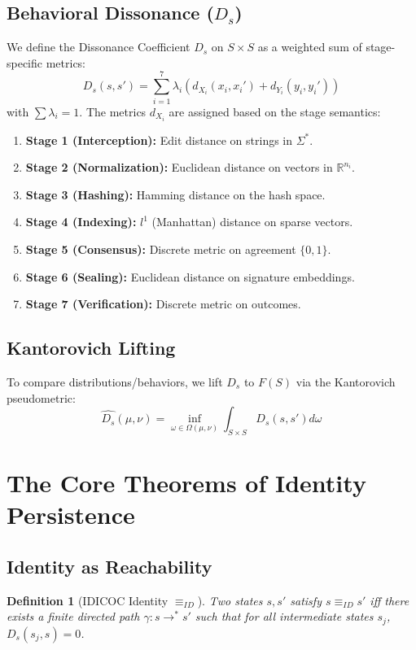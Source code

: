 \documentclass[11pt,a4paper]{article}
\newtheorem{definition}[theorem]{Definition}
\begin{document}
\subsection{Behavioral Dissonance ($D_s$)}
We define the Dissonance Coefficient $D_s$ on $S \times S$ as a weighted sum of stage-specific metrics:
\begin{equation}
D_s(s, s') = \sum_{i=1}^{7} \lambda_i (d_{X_i}(x_i, x_i') + d_{Y_i}(y_i, y_i'))
\end{equation}
with $\sum \lambda_i = 1$. The metrics $d_{X_i}$ are assigned based on the stage semantics:
\begin{enumerate}
    \item \textbf{Stage 1 (Interception):} Edit distance on strings in $\Sigma^*$.
    \item \textbf{Stage 2 (Normalization):} Euclidean distance on vectors in $\mathbb{R}^{n_i}$.
    \item \textbf{Stage 3 (Hashing):} Hamming distance on the hash space.
    \item \textbf{Stage 4 (Indexing):} $l^1$ (Manhattan) distance on sparse vectors.
    \item \textbf{Stage 5 (Consensus):} Discrete metric on agreement $\{0,1\}$.
    \item \textbf{Stage 6 (Sealing):} Euclidean distance on signature embeddings.
    \item \textbf{Stage 7 (Verification):} Discrete metric on outcomes.
\end{enumerate}

\subsection{Kantorovich Lifting}
To compare distributions/behaviors, we lift $D_s$ to $F(S)$ via the Kantorovich pseudometric:
\begin{equation}
\hat{D_s}(\mu, \nu) = \inf_{\omega \in \Omega(\mu, \nu)} \int_{S \times S} D_s(s, s') d\omega
\end{equation}

\section{The Core Theorems of Identity Persistence}

\subsection{Identity as Reachability}
\begin{definition}[IDICOC Identity $\equiv_{ID}$]
Two states $s, s'$ satisfy $s \equiv_{ID} s'$ iff there exists a finite directed path $\gamma: s \to^* s'$ such that for all intermediate states $s_j$, $D_s(s_j, s) = 0$.
\end{definition}
\end{document}
